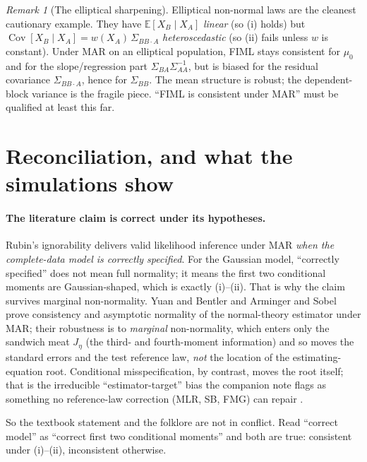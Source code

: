 \documentclass[11pt]{article}
\newcommand{\E}{\mathbb{E}}
\newcommand{\Cov}{\operatorname{Cov}}
\theoremstyle{plain}
\theoremstyle{remark}
\newtheorem*{remark}{Remark}
\begin{document}
\begin{remark}[The elliptical sharpening]
Elliptical non-normal laws are the cleanest cautionary example. They have
$\E[X_B\mid X_A]$ \emph{linear} (so (i) holds) but
$\Cov[X_B\mid X_A]=w(X_A)\,\Sigma_{BB\cdot A}$ \emph{heteroscedastic} (so (ii)
fails unless $w$ is constant). Under MAR on an elliptical population, FIML stays
consistent for $\mu_0$ and for the slope/regression part
$\Sigma_{BA}\Sigma_{AA}^{-1}$, but is biased for the residual covariance
$\Sigma_{BB\cdot A}$, hence for $\Sigma_{BB}$. The mean structure is robust; the
dependent-block variance is the fragile piece. ``FIML is consistent under MAR''
must be qualified at least this far.
\end{remark}

\section{Reconciliation, and what the simulations show}

\paragraph{The literature claim is correct under its hypotheses.}
Rubin's ignorability \cite{rubin1976} delivers valid likelihood inference under
MAR \emph{when the complete-data model is correctly specified}. For the Gaussian
model, ``correctly specified'' does not mean full normality; it means the first
two conditional moments are Gaussian-shaped, which is exactly (i)--(ii). That is
why the claim survives marginal non-normality. Yuan and Bentler
\cite{yuanbentler2000} and Arminger and Sobel \cite{armingersobel1990} prove
consistency and asymptotic normality of the normal-theory estimator under MAR;
their robustness is to \emph{marginal} non-normality, which enters only the
sandwich meat $J_\eta$ (the third- and fourth-moment information) and so moves
the standard errors and the test reference law, \emph{not} the location of the
estimating-equation root. Conditional misspecification, by contrast, moves the
root itself; that is the irreducible ``estimator-target'' bias the companion
note flags as something no reference-law correction (MLR, SB, FMG) can repair
\cite{savalei2010}.

So the textbook statement and the folklore are not in conflict. Read ``correct
model'' as ``correct first two conditional moments'' and both are true:
consistent under (i)--(ii), inconsistent otherwise.
\end{document}
